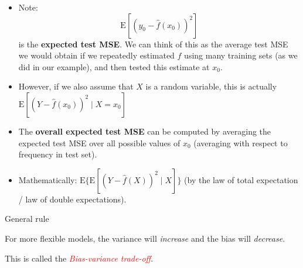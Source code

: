 \documentclass[
  ignorenonframetext,
]{beamer}
\begin{document}
\begin{frame}
\begin{itemize}
\item
  Note: \[\text{E}[(y_0 - \hat{f}(x_0))^2]\] is the \textbf{expected
  test MSE}. We can think of this as the average test MSE we would
  obtain if we repeatedly estimated \(f\) using many training sets (as
  we did in our example), and then tested this estimate at \(x_0\).
\item
  However, if we also assume that \(X\) is a random variable, this is
  actually \(\text{E}[(Y - \hat{f}(x_0))^2 \mid X=x_0]\)
\item
  The \textbf{overall expected test MSE} can be computed by averaging
  the expected test MSE over all possible values of \(x_0\) (averaging
  with respect to frequency in test set).
\item
  Mathematically: \(\text{E} \{ \text{E}[(Y - \hat{f}(X))^2 \mid X]\}\)
  (by the law of total expectation / law of double expectations).
\end{itemize}
\end{frame}

\begin{frame}
\begin{block}{General rule}
\protect\hypertarget{general-rule}{}
\vspace{4mm}

For more flexible models, the variance will \emph{increase} and the bias
will \emph{decrease}.

\vspace{4mm}

\centering

This is called the \emph{\textcolor{red}{Bias-variance trade-off}}.
\end{block}
\end{frame}
\end{document}
